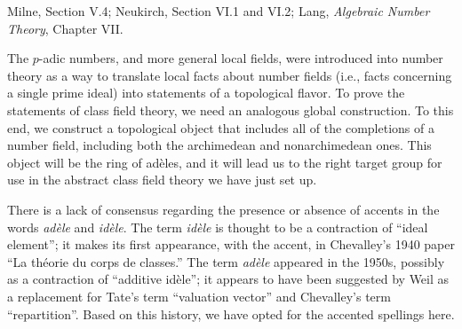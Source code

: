 %
%
%
%
%
%
%

Milne, Section V.4; Neukirch, Section VI.1 and VI.2; Lang, \textit{Algebraic Number Theory}, Chapter VII.

\medskip
The $p$-adic numbers, and more general local
fields, were introduced into number theory as a way to translate local facts about number fields (i.e., facts concerning a single prime ideal) into
statements of a topological flavor. To prove the statements of class field theory, we need an analogous global construction.
To this end, we construct a topological object that includes all of the
completions of a number field, including both the archimedean and nonarchimedean
ones. This object will be the ring of ad\`eles, and it will lead us to
the right target group for use in the abstract class field theory we
have just set up.

There is a lack of consensus regarding the presence or absence of accents in  the words \emph{ad\`ele} and \emph{id\`ele}. The term \emph{id\`ele} is thought to be a contraction of ``ideal element''; it makes its first appearance, with the accent, in Chevalley's 1940 paper ``La th\'eorie du corps de classes.'' The term \emph{ad\`ele} appeared in the 1950s, possibly as a contraction of ``additive id\`ele''; it appears to have been suggested by Weil as a replacement for Tate's term ``valuation vector'' and Chevalley's term ``repartition''.
Based on this history, we have opted for the accented spellings here.


